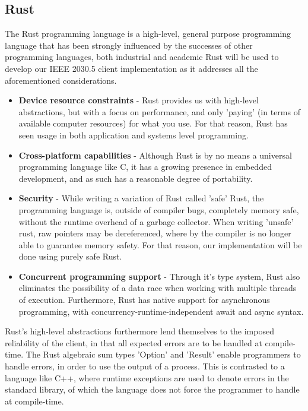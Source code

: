 \subsection{Rust}
The Rust programming language is a high-level, general purpose programming language that has been strongly influenced by the successes of other programming languages, both industrial and academic
Rust will be used to develop our IEEE 2030.5 client implementation as it addresses all the aforementioned considerations.

\begin{itemize}
    \item \textbf{Device resource constraints} - Rust provides us with high-level abstractions, but with a focus on performance, and only 'paying' (in terms of available computer resources) for what you use. For that reason, Rust has seen usage in both application and systems level programming.
    \item \textbf{Cross-platform capabilities} - Although Rust is by no means a universal programming language like C, it has a growing presence in embedded development, and as such has a reasonable degree of portability.
    \item \textbf{Security} - While writing a variation of Rust called 'safe' Rust, the programming language is, outside of compiler bugs, completely memory safe, without the runtime overhead of a garbage collector. When writing 'unsafe' rust, raw pointers may be dereferenced, where by the compiler is no longer able to guarantee memory safety. For that reason, our implementation will be done using purely safe Rust.
    \item \textbf{Concurrent programming support} - Through it's type system, Rust also eliminates the possibility of a data race when working with multiple threads of execution. Furthermore, Rust has native support for asynchronous programming, with concurrency-runtime-independent await and async syntax.
\end{itemize}

Rust's high-level abstractions furthermore lend themselves to the imposed reliability of the client, in that all expected errors are to be handled at compile-time. The Rust algebraic sum types 'Option' and 'Result' enable programmers to handle errors, in order to use the output of a process.
This is contrasted to a language like C++, where runtime exceptions are used to denote errors in the standard library, of which the language does not force the programmer to handle at compile-time.




